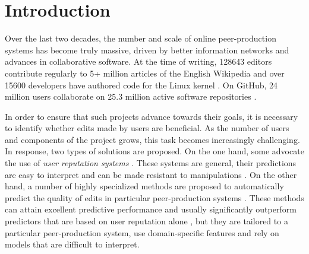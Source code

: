 \section{Introduction}
\label{sec:intro}

Over the last two decades, the number and scale of online peer-production systems has become truly massive, driven by better information networks and advances in collaborative software.
At the time of writing, \num{128643} editors contribute regularly to \num{5}+ million articles of the English Wikipedia \citep{wikipedia2017wikipedians} and over \num{15600} developers have authored code for the Linux kernel \citep{corbet2017linux}.
On GitHub, \num{24} million users collaborate on \num{25.3} million active software repositories \citep{github2017octoverse}.

In order to ensure that such projects advance towards their goals, it is necessary to identify whether edits made by users are beneficial.
As the number of users and components of the project grows, this task becomes increasingly challenging.
In response, two types of solutions are proposed.
On the one hand, some advocate the use of \emph{user reputation systems} \citep{resnick2000reputation, adler2007content}.
These systems are general, their predictions are easy to interpret and can be made resistant to manipulations \citep{dealfaro2013content}.
On the other hand, a number of highly specialized methods are proposed to automatically predict the quality of edits in particular peer-production systems \citep{druck2008learning, wikimedia2015artificial}.
These methods can attain excellent predictive performance \citep{heindorf2016vandalism} and usually significantly outperform predictors that are based on user reputation alone \citep{druck2008learning}, but they are tailored to a particular peer-production system, use domain-specific features and rely on models that are difficult to interpret.

